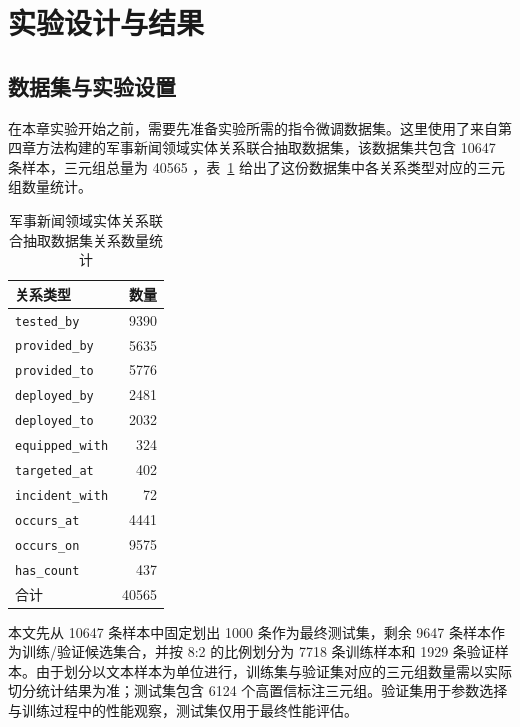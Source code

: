 \section{实验设计与结果}

\subsection{数据集与实验设置}

在本章实验开始之前，需要先准备实验所需的指令微调数据集。这里使用了来自第四章方法构建的军事新闻领域实体关系联合抽取数据集，该数据集共包含 10647 条样本，三元组总量为 40565 ，表~\ref{tab:ch5_relation_count} 给出了这份数据集中各关系类型对应的三元组数量统计。

\begin{table}[!htbp]
  \centering
  \caption{军事新闻领域实体关系联合抽取数据集关系数量统计}
  \label{tab:ch5_relation_count}
  {
  \small
  \setlength{\tabcolsep}{10pt}
  \begin{tabular}{@{}lr@{}}
    \toprule
    关系类型 & 数量 \\
    \midrule
    \texttt{tested\_by}     & 9390 \\
    \texttt{provided\_by}   & 5635 \\
    \texttt{provided\_to}   & 5776 \\
    \texttt{deployed\_by}   & 2481 \\
    \texttt{deployed\_to}   & 2032 \\
    \texttt{equipped\_with} & 324 \\
    \texttt{targeted\_at}   & 402 \\
    \texttt{incident\_with} & 72 \\
    \texttt{occurs\_at}     & 4441 \\
    \texttt{occurs\_on}     & 9575 \\
    \texttt{has\_count}     & 437 \\
    合计 & 40565 \\
    \bottomrule
  \end{tabular}}
\end{table}

\FloatBarrier

本文先从 10647 条样本中固定划出 1000 条作为最终测试集，剩余 9647 条样本作为训练/验证候选集合，并按 8:2 的比例划分为 7718 条训练样本和 1929 条验证样本。由于划分以文本样本为单位进行，训练集与验证集对应的三元组数量需以实际切分统计结果为准；测试集包含 6124 个高置信标注三元组。验证集用于参数选择与训练过程中的性能观察，测试集仅用于最终性能评估。

